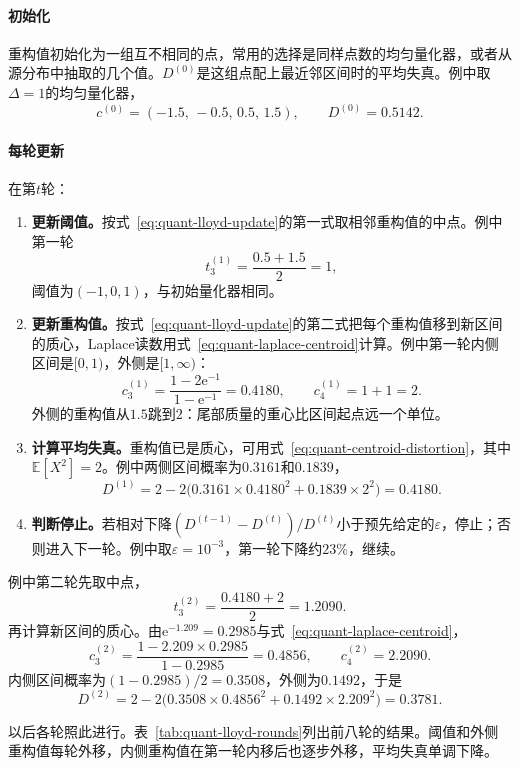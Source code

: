 \paragraph{初始化}
重构值初始化为一组互不相同的点，常用的选择是同样点数的均匀量化器，或者从源分布中抽取的几个值。$D^{(0)}$是这组点配上最近邻区间时的平均失真。例中取$\Delta=1$的均匀量化器，
\[
 c^{(0)}=(-1.5,\,-0.5,\,0.5,\,1.5),\qquad D^{(0)}=0.5142 .
\]

\paragraph{每轮更新}
在第$t$轮：
\begin{enumerate}
 \item \textbf{更新阈值。}按式~\eqref{eq:quant-lloyd-update}的第一式取相邻重构值的中点。例中第一轮
 \[
  t_3^{(1)}=\frac{0.5+1.5}{2}=1 ,
 \]
 阈值为$(-1,0,1)$，与初始量化器相同。

 \item \textbf{更新重构值。}按式~\eqref{eq:quant-lloyd-update}的第二式把每个重构值移到新区间的质心，Laplace读数用式~\eqref{eq:quant-laplace-centroid}计算。例中第一轮内侧区间是$[0,1)$，外侧是$[1,\infty)$：
 \[
  c_3^{(1)}=\frac{1-2\mathrm{e}^{-1}}{1-\mathrm{e}^{-1}}=0.4180,\qquad c_4^{(1)}=1+1=2 .
 \]
 外侧的重构值从$1.5$跳到$2$：尾部质量的重心比区间起点远一个单位。

 \item \textbf{计算平均失真。}重构值已是质心，可用式~\eqref{eq:quant-centroid-distortion}，其中$\mathbb{E}[X^2]=2$。例中两侧区间概率为$0.3161$和$0.1839$，
 \[
  D^{(1)}=2-2\bigl(0.3161\times0.4180^{2}+0.1839\times2^{2}\bigr)=0.4180 .
 \]

 \item \textbf{判断停止。}若相对下降$(D^{(t-1)}-D^{(t)})/D^{(t)}$小于预先给定的$\varepsilon$，停止；否则进入下一轮。例中取$\varepsilon=10^{-3}$，第一轮下降约$23\%$，继续。
\end{enumerate}

例中第二轮先取中点，
\[
 t_3^{(2)}=\frac{0.4180+2}{2}=1.2090 .
\]
再计算新区间的质心。由$\mathrm{e}^{-1.209}=0.2985$与式~\eqref{eq:quant-laplace-centroid}，
\[
 c_3^{(2)}=\frac{1-2.209\times0.2985}{1-0.2985}=0.4856,\qquad c_4^{(2)}=2.2090 .
\]
内侧区间概率为$(1-0.2985)/2=0.3508$，外侧为$0.1492$，于是
\[
 D^{(2)}=2-2\bigl(0.3508\times0.4856^{2}+0.1492\times2.209^{2}\bigr)=0.3781 .
\]

以后各轮照此进行。表~\ref{tab:quant-lloyd-rounds}列出前八轮的结果。阈值和外侧重构值每轮外移，内侧重构值在第一轮内移后也逐步外移，平均失真单调下降。

